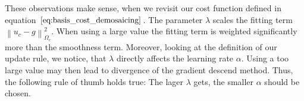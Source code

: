 \documentclass{paper}
\newcommand{\norm}[1]{\left\lVert#1\right\rVert}
\begin{document}
These observations make sense, when we revisit our cost function defined in equation $\ref{eq:basis_cost_demosaicing}$. The parameter $\lambda$ scales the fitting term $\norm{u_c - g}^2_{\Omega_{c}}$. When using a large value the fitting term is weighted significantly more than the smoothness term. Moreover, looking at the definition of our update rule, we notice, that $\lambda$ directly affects the learning rate $\alpha$. Using a too large value may then lead to divergence of the gradient descend method. Thus, the following rule of thumb holds true: The lager $\lambda$ gets, the smaller $\alpha$ should be chosen.

\begin{figure}[H]
\begin{center}
\end{center}
\end{figure}
\end{document}
